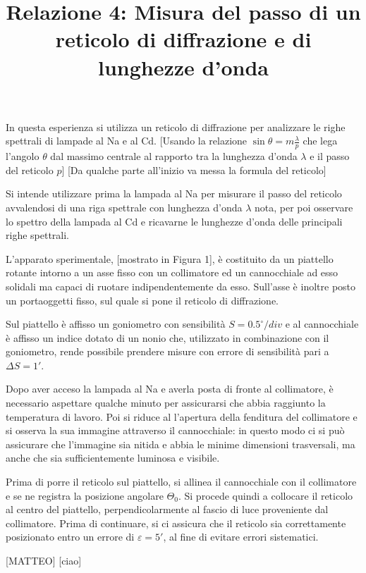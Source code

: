 \documentclass{article}
\title{Relazione 4: Misura del passo di un reticolo di diffrazione
	e di lunghezze d'onda}
\date{}
\begin{document}
	\maketitle
	
	
	In questa esperienza si utilizza un reticolo di diffrazione per analizzare le righe spettrali di lampade al Na e al Cd. [Usando la relazione $\sin{\theta}=m\frac{\lambda}{p}$ che lega l'angolo $\theta$ dal massimo centrale al rapporto tra la lunghezza d'onda $\lambda$ e il passo del reticolo $p$] [Da qualche parte all'inizio va messa la formula del reticolo]
	
	Si intende utilizzare prima la lampada al Na per misurare il passo del reticolo avvalendosi di una riga spettrale con lunghezza d'onda $\lambda$ nota, per poi osservare lo spettro della lampada al Cd e ricavarne le lunghezze d'onda delle principali righe spettrali.
	
	L'apparato sperimentale, [mostrato in Figura 1], è costituito da un piattello rotante intorno a un asse fisso con un collimatore ed un cannocchiale ad esso solidali ma capaci di ruotare indipendentemente da esso. Sull'asse è inoltre posto un portaoggetti fisso, sul quale si pone il reticolo di diffrazione.
	
	Sul piattello è affisso un goniometro con sensibilità $S=0.5^{\circ} / div$ e al cannocchiale è affisso un indice dotato di un nonio che, utilizzato in combinazione con il goniometro, rende possibile prendere misure con errore di sensibilità pari a $\Delta S = 1'$.

 Dopo aver acceso la lampada al Na e averla posta di fronte al collimatore, è necessario aspettare qualche minuto per assicurarsi che abbia raggiunto la temperatura di lavoro. Poi si riduce al l'apertura della fenditura del collimatore e si osserva la sua immagine attraverso il cannocchiale: in questo modo ci si può assicurare che l'immagine sia nitida e abbia le minime dimensioni trasversali, ma anche che sia sufficientemente luminosa e visibile.

Prima di porre il reticolo sul piattello, si allinea il cannocchiale con il collimatore e se ne registra la posizione angolare $\Theta_0$. Si procede quindi a collocare il reticolo al centro del piattello, perpendicolarmente al fascio di luce proveniente dal collimatore. Prima di continuare, si ci assicura che il reticolo sia correttamente posizionato entro un errore di $\varepsilon = 5'$, al fine di evitare errori sistematici.


	
 [MATTEO] [ciao]
 
\end{document}
